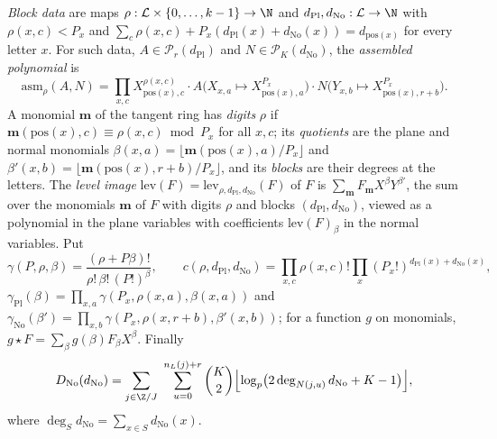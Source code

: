 \begin{definition}\label{pf:linkG:blockdefs}
\emph{Block data} are maps $\rho:\mathcal L\times\{0,\dots,k-1\}\to\N$ and $d_{\mathrm{Pl}},d_{\mathrm{No}}:\mathcal L\to\N$ with
$\rho(x,c)<P_x$ and $\sum_c\rho(x,c)+P_x(d_{\mathrm{Pl}}(x)+d_{\mathrm{No}}(x))=d_{\mathrm{pos}(x)}$ for every letter $x$. For such
data, $A\in\mathcal P_r(d_{\mathrm{Pl}})$ and $N\in\mathcal P_K(d_{\mathrm{No}})$, the \emph{assembled polynomial} is
\[
\mathrm{asm}_\rho(A,N)=\prod_{x,c}X_{\mathrm{pos}(x),c}^{\rho(x,c)}\cdot A\bigl(X_{x,a}\mapsto X_{\mathrm{pos}(x),a}^{P_x}\bigr)\cdot
N\bigl(Y_{x,b}\mapsto X_{\mathrm{pos}(x),r+b}^{P_x}\bigr).
\]
A monomial $\mathbf m$ of the tangent ring has \emph{digits} $\rho$ if $\mathbf m(\mathrm{pos}(x),c)\equiv\rho(x,c)\bmod P_x$ for all
$x,c$; its \emph{quotients} are the plane and normal monomials $\beta(x,a)=\lfloor\mathbf m(\mathrm{pos}(x),a)/P_x\rfloor$ and
$\beta'(x,b)=\lfloor\mathbf m(\mathrm{pos}(x),r+b)/P_x\rfloor$, and its \emph{blocks} are their degrees at the letters. The \emph{level
image} $\mathrm{lev}(F)=\mathrm{lev}_{\rho,d_{\mathrm{Pl}},d_{\mathrm{No}}}(F)$ of $F$ is $\sum_{\mathbf m}F_{\mathbf m}X^\beta Y^{\beta'}$, the sum over the
monomials $\mathbf m$ of $F$ with digits $\rho$ and blocks $(d_{\mathrm{Pl}},d_{\mathrm{No}})$, viewed as a polynomial in the plane
variables with coefficients $\mathrm{lev}(F)_\beta$ in the normal variables. Put
\[
\gamma(P,\rho,\beta)=\frac{(\rho+P\beta)!}{\rho!\,\beta!\,(P!)^\beta},\qquad
c(\rho,d_{\mathrm{Pl}},d_{\mathrm{No}})=\prod_{x,c}\rho(x,c)!\prod_x(P_x!)^{d_{\mathrm{Pl}}(x)+d_{\mathrm{No}}(x)},
\]
$\gamma_{\mathrm{Pl}}(\beta)=\prod_{x,a}\gamma(P_x,\rho(x,a),\beta(x,a))$ and $\gamma_{\mathrm{No}}(\beta')=\prod_{x,b}\gamma(P_x,\rho(x,r+b),\beta'(x,b))$;
for a function $g$ on monomials, $g\star F=\sum_\beta g(\beta)F_\beta X^\beta$. Finally
\[
D_{\mathrm{No}}(d_{\mathrm{No}})=\sum_{j\in\Z/J}\ \sum_{u=0}^{n_L(j)+r}\binom K2\Bigl\lfloor\log_p\bigl(2\deg_{N(j,u)}d_{\mathrm{No}}+K-1\bigr)\Bigr\rfloor,
\]
where $\deg_Sd_{\mathrm{No}}=\sum_{x\in S}d_{\mathrm{No}}(x)$.


\end{definition}

